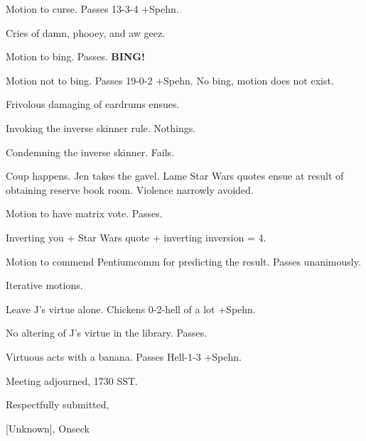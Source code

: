 \documentclass[12pt]{article}
\newcommand{\bing}{{\bf BING!} }
\begin{document}
Motion to curse. Passes 13-3-4 +Spehn.

Cries of damn, phooey, and aw geez.

Motion to bing. Passes. \bing

Motion not to bing. Passes 19-0-2 +Spehn. No bing, motion does not exist.

Frivolous damaging of eardrums ensues.

Invoking the inverse skinner rule. Nothings.

Condemning the inverse skinner. Fails.

Coup happens. Jen takes the gavel. Lame Star Wars quotes ensue at result of obtaining reserve book room. Violence narrowly avoided.

Motion to have matrix vote. Passes.

Inverting you + Star Wars quote + inverting inversion = 4.

Motion to commend Pentiumcomm for predicting the result. Passes unanimously.

Iterative motions.

Leave J's virtue alone. Chickens 0-2-hell of a lot +Spehn.

No altering of J's virtue in the library. Passes.

Virtuous acts with a banana. Passes Hell-1-3 +Spehn.

\vspace{12pt}

\noindent
Meeting adjourned, 1730 SST.

\vspace{18pt}

\centerline{Respectfully submitted,}
\centerline{[Unknown], Onseck}
\end{document}
